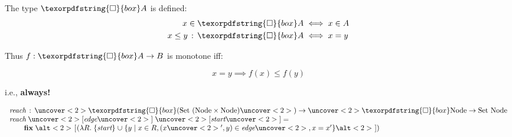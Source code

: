 \documentclass[aspectratio=169,dvipsnames]{beamer}
\providecommand\strong[1]{{\bfseries#1}}
\newcommand\x\times
\newcommand\fn{\ensuremath{\lambda}}
\newcommand\isa{\mathrel{\,\text{:}\,}}
\newcommand\fnof[1]{\fn{#1}.\;}
\newcommand\iso{{\texorpdfstring{\ensuremath{\square}}{box}}}
\newcommand\ebox[1]{[{#1}]}
\newcommand\pbox[1]{[{#1}]}
\newcommand{\setfor}[2]{\{{#1} \mathrel{|} {#2}\}}
\newcommand\kw\textbf\newcommand\n\textit\newcommand\tpname\text
\newcommand\tset{\tpname{Set}~}
\newcommand\tnode{\tpname{Node}}
\begin{document}
  \begin{frame}
    The type $\iso A$ is defined:
    \begin{align*}
      x \in \iso A &\iff x \in A\\
      x \le y \isa \iso A &\iff x = y
    \end{align*}

    Thus $f : \iso A \to B$ is monotone iff:

    \[ x = y \implies f(x) \le f(y) \]

    i.e., \strong{always!}
  \end{frame}



  \begin{frame}
    \begin{fleqn}[2em]
      \centering
      \textsc{}
      \vspace{1ex}

      \[\begin{array}{l}
      \n{reach} \isa
      \uncover<2>{\iso(}\tset (\tnode \x \tnode)\uncover<2>{)}
      \to \uncover<2>{\iso}\tnode
      \to \tset \tnode
      \\
      \n{reach} \;\uncover<2>{[}\n{edge}\uncover<2>{]}
      \;\uncover<2>{[}\n{start}\uncover<2>{]} =\\
      \qquad
      \kw{fix}\; \alt<2>{\kern.8pt [\kern .8pt}{(}\fnof R \{\n{start}\}
      \cup \setfor{y}{x \in R, (x\uncover<2>{'},y) \in \n{edge}%
        \uncover<2>{, x = x'}}%
      \alt<2>{\kern .8pt]}{)}
      \end{array}\]
    \end{fleqn}
  \end{frame}
\end{document}
